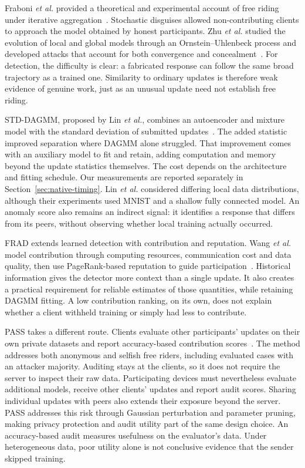 \documentclass[conference]{IEEEtran}
\makeatletter
\renewcommand{\subsection}{\@startsection{subsection}{2}{\z@}{1.5ex}{0.7ex}{\normalfont\normalsize\itshape}}
\makeatother
\begin{document}
Fraboni \emph{et al.} provided a theoretical and experimental account of free
riding under iterative aggregation~\cite{fraboni2021freerider}. Stochastic
disguises allowed non-contributing clients to approach the model obtained
by honest participants. Zhu \emph{et al.} studied the evolution of local and
global models through an Ornstein--Uhlenbeck process and developed attacks
that account for both convergence and concealment~\cite{zhu2021advanced}.
For detection, the difficulty is clear: a fabricated response can follow
the same broad trajectory as a trained one. Similarity to ordinary updates
is therefore weak evidence of genuine work, just as an unusual update
need not establish free riding.

\subsection{Learned Detection and Contribution Auditing}
STD-DAGMM, proposed by Lin \emph{et al.}, combines an autoencoder and mixture
model with the standard deviation of submitted
updates~\cite{lin2019freeriders,zong2018dagmm}. The added statistic improved separation
where DAGMM alone struggled. That improvement comes with an auxiliary model
to fit and retain, adding computation and memory beyond the update
statistics themselves. The cost depends on the architecture and fitting
schedule. Our measurements are reported separately in
Section~\ref{sec:native-timing}. Lin \emph{et al.} considered differing local
data distributions, although their experiments used MNIST and a shallow
fully connected model. An anomaly score also remains an indirect signal:
it identifies a response that differs from its peers, without observing
whether local training actually occurred.

FRAD extends learned detection with contribution and reputation.
Wang \emph{et al.} model contribution through computing resources,
communication cost and data quality, then use PageRank-based reputation
to guide participation~\cite{wang2024frad}. Historical information gives
the detector more context than a single update. It also creates a practical
requirement for reliable estimates of those quantities, while retaining
DAGMM fitting. A low contribution ranking, on its own, does not explain
whether a client withheld training or simply had less to contribute.

PASS takes a different route. Clients evaluate other participants' updates
on their own private datasets and report accuracy-based contribution
scores~\cite{wang2024pass}. The method addresses both anonymous and selfish
free riders, including evaluated cases with an attacker majority. Auditing
stays at the clients, so it does not require the server to inspect their raw
data. Participating devices must nevertheless evaluate additional models,
receive other clients' updates and report audit scores. Sharing individual
updates with peers also extends their exposure beyond the server. PASS
addresses this risk through Gaussian perturbation and parameter pruning,
making privacy protection and audit utility part of the same design choice.
An accuracy-based audit measures usefulness on the evaluator's data.
Under heterogeneous data, poor utility alone is not conclusive evidence
that the sender skipped training.
\end{document}
